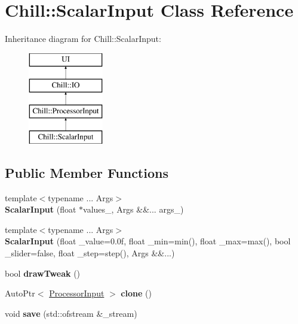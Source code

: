 \hypertarget{class_chill_1_1_scalar_input}{}\section{Chill\+:\+:Scalar\+Input Class Reference}
\label{class_chill_1_1_scalar_input}
Inheritance diagram for Chill\+:\+:Scalar\+Input\+:\begin{figure}[H]
\begin{center}
\leavevmode
\includegraphics[height=4.000000cm]{class_chill_1_1_scalar_input}
\end{center}
\end{figure}
\subsection*{Public Member Functions}
\begin{DoxyCompactItemize}
\item 
\mbox{\label{class_chill_1_1_scalar_input_a7d31e0df03ca9355c7e252a8273cf3cb}} 
{\footnotesize template$<$typename ... Args$>$ }\\{\bfseries Scalar\+Input} (float $\ast$values\+\_\+, Args \&\&... args\+\_\+)
\item 
\mbox{\label{class_chill_1_1_scalar_input_a42c8d6498cf139dc2c9f15cd164e7cbe}} 
{\footnotesize template$<$typename ... Args$>$ }\\{\bfseries Scalar\+Input} (float \+\_\+value=0.\+0f, float \+\_\+min=min(), float \+\_\+max=max(), bool \+\_\+slider=false, float \+\_\+step=step(), Args \&\&...)
\item 
\mbox{\label{class_chill_1_1_scalar_input_a61d074fd513eb5a4fb60ebbf58d7e717}} 
bool {\bfseries draw\+Tweak} ()
\item 
\mbox{\label{class_chill_1_1_scalar_input_a2076ae9ebe9ac1ac6eeb789e757182b0}} 
Auto\+Ptr$<$ \mbox{\hyperlink{class_chill_1_1_processor_input}{Processor\+Input}} $>$ {\bfseries clone} ()
\item 
\mbox{\label{class_chill_1_1_scalar_input_af5d0eb6a91d91ac043c84da0e808ea45}} 
void {\bfseries save} (std\+::ofstream \&\+\_\+stream)
\end{DoxyCompactItemize}
